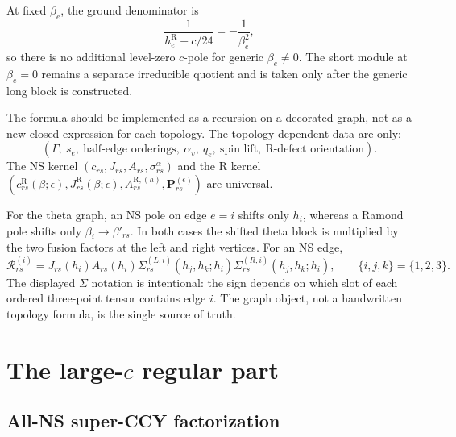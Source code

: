 \documentclass[11pt]{article}
\newcommand{\R}{\mathrm{R}}
\begin{document}
At fixed \(\beta_e\), the ground denominator is
\begin{equation}
 \frac{1}{h_e^{\R}-c/24}=-\frac{1}{\beta_e^2},
 \label{eq:r-short-c-pole}
\end{equation}
so there is no additional level-zero \(c\)-pole for generic
\(\beta_e\neq0\).  The short module at \(\beta_e=0\) remains a separate
irreducible quotient and is taken only after the generic long block is
constructed.

The formula should be implemented as a recursion on a decorated graph, not
as a new closed expression for each topology.  The topology-dependent data
are only:
\begin{equation}
 (\Gamma,\ s_e,\ \text{half-edge orderings},\ \alpha_v,\ q_e,
 \ \text{spin lift},\ \text{R-defect orientation}).
 \label{eq:graph-data}
\end{equation}
The NS kernel $(c_{rs},J_{rs},A_{rs},\sigma_{rs}^{\alpha})$ and the R kernel
$(c^{\R}_{rs}(\beta;\epsilon),J^{\R}_{rs}(\beta;\epsilon),
A^{\R,(h)}_{rs},\mathbf P_{rs}^{(\epsilon)})$ are universal.

For the theta graph, an NS pole on edge \(e=i\) shifts only \(h_i\), whereas
a Ramond pole shifts only \(\beta_i\to\beta'_{rs}\).  In both cases the
shifted theta block is multiplied by the two fusion factors at the left and
right vertices.  For an NS edge,
\begin{equation}
 \mathcal R_{rs}^{(i)}
 =J_{rs}(h_i)A_{rs}(h_i)
 \Sigma_{rs}^{(L,i)}(h_j,h_k;h_i)
 \Sigma_{rs}^{(R,i)}(h_j,h_k;h_i),
 \qquad\{i,j,k\}=\{1,2,3\}.
 \label{eq:theta-residue}
\end{equation}
The displayed $\Sigma$ notation is intentional: the sign depends on which
slot of each ordered three-point tensor contains edge $i$.  The graph object,
not a handwritten topology formula, is the single source of truth.

\section{\texorpdfstring{The large-$c$ regular part}{The large-c regular part}}
\label{sec:large-c}

\subsection{All-NS super-CCY factorization}
\end{document}
